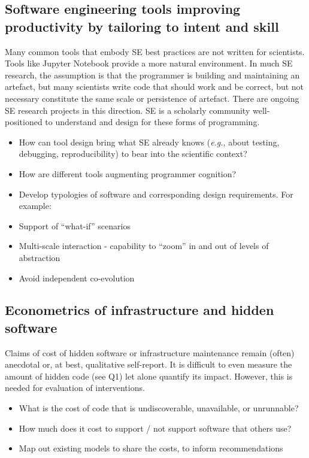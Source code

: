 \documentclass[a4paper,UKenglish]{dagman}
\newcommand{\eg}{\emph{e.g.},\xspace}
\begin{document}
\subsection{Software engineering tools improving productivity by tailoring to intent and skill}

Many common tools that embody SE best practices are not written for scientists. Tools like Jupyter Notebook provide a more natural environment. In much SE research, the assumption is that the programmer is building and maintaining an artefact, but many scientists write code that should work and be correct, but not necessary constitute the same scale or persistence of artefact. There are ongoing SE research projects in this direction. SE is a scholarly community well-positioned to understand and design for these forms of programming.

\begin{itemize}
\item How can tool design bring what SE already knows (\eg about testing, debugging, reproducibility) to bear into the scientific context?
\item How are different tools augmenting programmer cognition?
\item Develop typologies of software and corresponding design requirements. For example:
\item Support of ``what-if'' scenarios
\item Multi-scale interaction - capability to ``zoom'' in and out of levels of abstraction
\item Avoid independent co-evolution
\end{itemize}

\subsection{Econometrics of infrastructure and hidden software}

Claims of cost of hidden software or infrastructure maintenance remain (often) anecdotal or, at best, qualitative self-report. It is difficult to even measure the amount of hidden code (see Q1) let alone quantify its impact. However, this is needed for evaluation of interventions.


\begin{itemize}
\item What is the cost of code that is undiscoverable, unavailable, or unrunnable?
\item How much does it cost to support / not support software that others use? 
\item Map out existing models to share the costs, to inform recommendations
\end{itemize}
\end{document}
